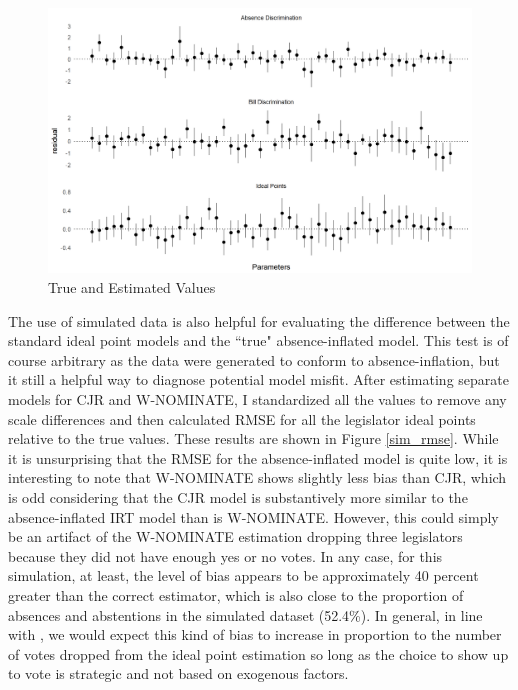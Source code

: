 	\begin{figure}
		\caption{True and Estimated Values}\label{sim_results}
		\includegraphics[width=\linewidth]{param_resid}
	\end{figure} 
	
	The use of simulated data is also helpful for evaluating the difference between the standard ideal point models and the ``true" absence-inflated model. This test is of course arbitrary as the data were generated to conform to absence-inflation, but it still a helpful way to diagnose potential model misfit. After estimating separate models for CJR and W-NOMINATE, I standardized all the values to remove any scale differences and then calculated RMSE for all the legislator ideal points relative to the true values. These results are shown in Figure \ref{sim_rmse}. While it is unsurprising that the RMSE for the absence-inflated model is quite low, it is interesting to note that W-NOMINATE shows slightly less bias than CJR, which is odd considering that the CJR model is substantively more similar to the absence-inflated IRT model than is W-NOMINATE. However, this could simply be an artifact of the W-NOMINATE estimation dropping three legislators because they did not have enough yes or no votes. In any case, for this simulation, at least, the level of bias appears to be approximately 40 percent greater than the correct estimator, which is also close to the proportion of absences and abstentions in the simulated dataset (52.4\%). In general, in line with \textcite{rosas2015}, we would expect this kind of bias to increase in proportion to the number of votes dropped from the ideal point estimation so long as the choice to show up to vote is strategic and not based on exogenous factors.
	
